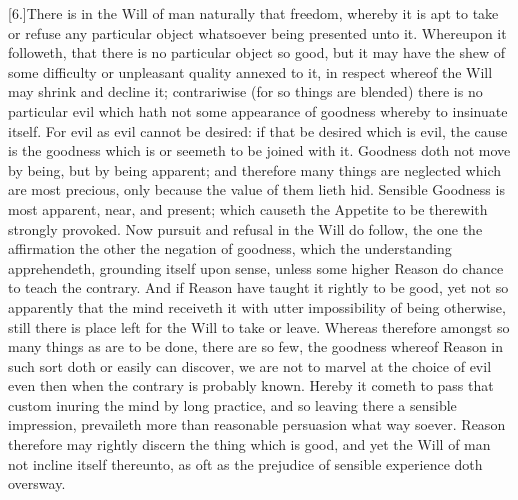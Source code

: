 [6.]There is in the Will of man naturally that freedom, whereby it is apt to take or refuse any particular object whatsoever being presented unto it. Whereupon it followeth,  that there is no particular object so good, but it may have the shew of some difficulty or unpleasant quality annexed to it, in respect whereof the Will may shrink and decline it; contrariwise (for so things are blended) there is no particular evil which hath not some appearance of goodness whereby to insinuate itself. For evil as evil cannot be desired: if that be desired which is evil, the cause is the goodness which is or seemeth to be joined with it. Goodness doth not move by being, but by being apparent; and therefore many things are neglected which are most precious, only because the value of them lieth hid. Sensible Goodness is most apparent, near, and present; which causeth the Appetite to be therewith strongly provoked. Now pursuit and refusal in the Will do follow, the one the affirmation the other the negation of goodness, which the understanding apprehendeth, grounding itself upon sense, unless some higher Reason do chance to teach the contrary. And if Reason have taught it rightly to be good, yet not so apparently that the mind receiveth it with utter impossibility of being otherwise, still there is place left for the Will to take or leave. Whereas therefore amongst so many things as are to be done, there are so few, the goodness whereof Reason in such sort doth or easily can discover, we are not to marvel at the choice of evil even then when the contrary is probably known. Hereby it cometh to pass that custom inuring the mind by long practice, and so leaving there a sensible impression, prevaileth more than reasonable  persuasion what way soever. Reason therefore may rightly discern the thing which is good, and yet the Will of man not incline itself thereunto, as oft as the prejudice of sensible experience doth oversway.

